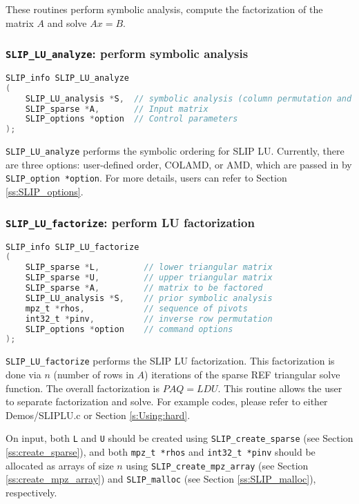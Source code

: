 \documentclass[11pt]{article}
\theoremstyle{definition}
\begin{document}
These routines perform symbolic analysis, compute the factorization of the matrix $A$ and solve $Ax=B$.

\cprotect\subsubsection{\verb|SLIP_LU_analyze|: perform symbolic analysis}
\begin{lstlisting}[language=C,frame=single]
SLIP_info SLIP_LU_analyze
(
    SLIP_LU_analysis *S,  // symbolic analysis (column permutation and nnz L,U)
    SLIP_sparse *A,       // Input matrix
    SLIP_options *option  // Control parameters
);
\end{lstlisting}

\verb|SLIP_LU_analyze| performs the symbolic ordering for SLIP LU. Currently, there are three options: user-defined order, COLAMD, or AMD, which are passed in by \verb|SLIP_option *option|. For more details, users can refer to Section \ref{ss:SLIP_options}.


\cprotect\subsubsection{\verb|SLIP_LU_factorize|: perform LU factorization}\label{ss:SLIP_LU_factorize}

\begin{lstlisting}[language=C,frame=single]
SLIP_info SLIP_LU_factorize
(
    SLIP_sparse *L,         // lower triangular matrix
    SLIP_sparse *U,         // upper triangular matrix
    SLIP_sparse *A,         // matrix to be factored
    SLIP_LU_analysis *S,    // prior symbolic analysis
    mpz_t *rhos,            // sequence of pivots
    int32_t *pinv,          // inverse row permutation
    SLIP_options *option    // command options
);
\end{lstlisting}

\verb|SLIP_LU_factorize| performs the SLIP LU factorization. This factorization is done via $n$ (number of rows in $A$) iterations of the sparse REF triangular solve function. The overall factorization is $PAQ = LDU$.  This routine allows the user to separate factorization and solve. For example codes, please refer to either Demos/SLIPLU.c or Section \ref{s:Using:hard}.

On input, both \verb|L| and \verb|U| should be created using \verb|SLIP_create_sparse| (see Section \ref{ss:create_sparse}), and both \verb|mpz_t *rhos| and \verb|int32_t *pinv| should be allocated as arrays of size $n$ using \verb|SLIP_create_mpz_array| (see Section \ref{ss:create_mpz_array}) and \verb|SLIP_malloc| (see Section \ref{ss:SLIP_malloc}), respectively.
\end{document}
